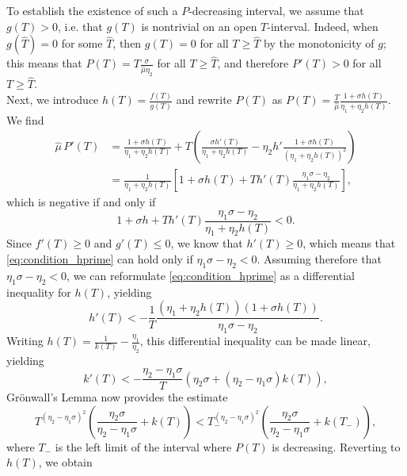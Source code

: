 \documentclass[a4paper,10pt,abstract=true,parskip=true]{scrartcl}
\theoremstyle{remark}
\numberwithin{equation}{section}
\numberwithin{thm}{section}
\begin{document}
To establish the existence of such a $P$-decreasing interval, we assume that $g(T) > 0$, i.e. that $g(T)$ is nontrivial on an open $T$-interval. Indeed, when $g(\hat{T}) = 0$ for some $\hat{T}$, then $g(T) = 0$ for all $T \geq \hat{T}$ by the monotonicity of $g$; this means that $P(T) = T \frac{\sigma}{\hat{\mu} \eta_2}$ for all $T \geq \hat{T}$, and therefore $P'(T)>0$ for all $T \geq \hat{T}$.\\
Next, we introduce $h(T) = \frac{f(T)}{g(T)}$ and rewrite $P(T)$ as $P(T) = \frac{T}{\hat{\mu}} \frac{1+\sigma h(T)}{\eta_1+\eta_2 h(T)}$. We find
\begin{align*}
    \hat{\mu}  \, P'(T) &= \frac{1+\sigma h(T)}{\eta_1+\eta_2 h(T)} + T \left(\frac{\sigma h'(T)}{\eta_1+\eta_2 h(T)} - \eta_2 h' \frac{1+\sigma h(T)}{(\eta_1+\eta_2 h(T))^2}\right)\\
    &= \frac{1}{\eta_1+\eta_2 h(T)} \left[1 + \sigma h(T) +T h'(T)\frac{\eta_1\sigma -\eta_2}{\eta_1+\eta_2 h(T)} \right],
\end{align*}
which is negative if and only if 
\begin{equation}\label{eq:condition_hprime}
    1 + \sigma h+T h'(T)\frac{\eta_1\sigma -\eta_2}{\eta_1+\eta_2 h(T)}<0.
\end{equation}
Since $f'(T) \geq 0$ and $g'(T) \leq 0$, we know that $h'(T) \geq 0$, which means that \eqref{eq:condition_hprime} can hold only if $\eta_1\sigma - \eta_2 < 0$. Assuming therefore that $\eta_1\sigma - \eta_2 < 0$, we can reformulate \eqref{eq:condition_hprime} as a differential inequality for $h(T)$, yielding
\begin{displaymath}
    h'(T) < -\frac{1}{T} \frac{(\eta_1+\eta_2 h(T))(1+\sigma h(T))}{\eta_1\sigma -\eta_2}.
\end{displaymath}
Writing $h(T) = \frac{1}{k(T)} - \frac{\eta_1}{\eta_2}$, this differential inequality can be made linear, yielding
\begin{displaymath}
    k'(T) < -\frac{\eta_2-\eta_1 \sigma}{T}\left(\eta_2 \sigma + (\eta_2-\eta_1 \sigma)k(T)\right),
\end{displaymath}
Gr{\"o}nwall's Lemma now provides the estimate
\begin{displaymath}
    T^{(\eta_2-\eta_1 \sigma)^2}\left(\frac{\eta_2 \sigma}{\eta_2-\eta_1 \sigma} + k(T)\right) < T_-^{(\eta_2-\eta_1 \sigma)^2}\left(\frac{\eta_2 \sigma}{\eta_2-\eta_1 \sigma} + k(T_-)\right),
\end{displaymath}
where $T_-$ is the left limit of the interval where $P(T)$ is decreasing. Reverting to $h(T)$, we obtain
\end{document}
